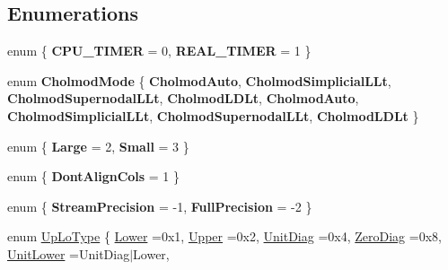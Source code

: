 \subsection*{Enumerations}
\begin{DoxyCompactItemize}
\item 
\mbox{\label{namespace_eigen_ae1624e3211f55e6e6a6b37729c51c37a}} 
enum \{ {\bfseries C\+P\+U\+\_\+\+T\+I\+M\+ER} = 0, 
{\bfseries R\+E\+A\+L\+\_\+\+T\+I\+M\+ER} = 1
 \}
\item 
\mbox{\label{namespace_eigen_a8cf3958430069971186dfd7afe6864b3}} 
enum {\bfseries Cholmod\+Mode} \{ \newline
{\bfseries Cholmod\+Auto}, 
{\bfseries Cholmod\+Simplicial\+L\+Lt}, 
{\bfseries Cholmod\+Supernodal\+L\+Lt}, 
{\bfseries Cholmod\+L\+D\+Lt}, 
\newline
{\bfseries Cholmod\+Auto}, 
{\bfseries Cholmod\+Simplicial\+L\+Lt}, 
{\bfseries Cholmod\+Supernodal\+L\+Lt}, 
{\bfseries Cholmod\+L\+D\+Lt}
 \}
\item 
\mbox{\label{namespace_eigen_a6040c4235ce91c5a619626204937aa49}} 
enum \{ {\bfseries Large} = 2, 
{\bfseries Small} = 3
 \}
\item 
\mbox{\label{namespace_eigen_a0dcb7c7a0b7d02aa74edde5ff0a2d60a}} 
enum \{ {\bfseries Dont\+Align\+Cols} = 1
 \}
\item 
\mbox{\label{namespace_eigen_ad4175f0d40caf063570bd7d4dbfee305}} 
enum \{ {\bfseries Stream\+Precision} = -\/1, 
{\bfseries Full\+Precision} = -\/2
 \}
\item 
enum \hyperlink{group__enums_ga39e3366ff5554d731e7dc8bb642f83cd}{Up\+Lo\+Type} \{ \newline
\hyperlink{group__enums_gga39e3366ff5554d731e7dc8bb642f83cda891792b8ed394f7607ab16dd716f60e6}{Lower} =0x1, 
\hyperlink{group__enums_gga39e3366ff5554d731e7dc8bb642f83cda6bcb58be3b8b8ec84859ce0c5ac0aaec}{Upper} =0x2, 
\hyperlink{group__enums_gga39e3366ff5554d731e7dc8bb642f83cdaddb72f888ac85d5a1c52333e54f9374b}{Unit\+Diag} =0x4, 
\hyperlink{group__enums_gga39e3366ff5554d731e7dc8bb642f83cda884ff7240392e85aa6e4b3c957e36483}{Zero\+Diag} =0x8, 
\newline
\hyperlink{group__enums_gga39e3366ff5554d731e7dc8bb642f83cda8155cfdfde9e75e7144dff0393d17181}{Unit\+Lower} =Unit\+Diag$\vert$\+Lower, 

\end{DoxyCompactItemize}
